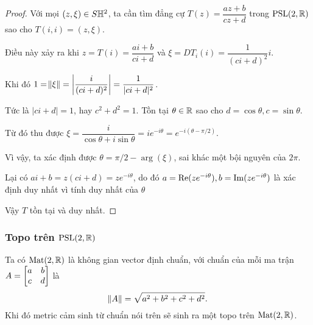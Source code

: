 \begin{proof}
    Với mọi $(z,\xi) \in S\mathbb{H}^2$, ta cần tìm đẳng cự $T(z) = \dfrac{az+b}{cz+d}$ trong $\operatorname{PSL}(2,\mathbb{R})$ sao cho $T(i,i) = (z,\xi)$. 

    Điều này xảy ra khi
    $z = T(i) = \dfrac{ai+b}{ci+d}$ và $\xi = DT_i(i) = \dfrac{1}{(ci+d)^2}i.$

    Khi đó $1 = \norm{\xi} = \left|\dfrac{i}{(ci+d)^2}\right|=\dfrac{1}{|ci+d|^2}$. 
    
    Tức là $|ci+d| = 1$, hay $c^2+d^2 = 1$. Tồn tại $\theta \in \mathbb{R}$ sao cho $d = \cos\theta, c=\sin\theta$. 
    
    Từ đó thu được $\xi = \dfrac{i}{\cos\theta + i\sin\theta} = ie^{-i\theta} = e^{-i(\theta -\pi/2)}$. 
    
    Vì vậy, ta xác định được $\theta =  \pi/2 - \arg(\xi)$, sai khác một bội nguyên của $2\pi$.

    Lại có $ai+b = z(ci+d) = ze^{-i\theta}$, do đó $a = \operatorname{Re}(ze^{-i\theta}), b = \operatorname{Im}(ze^{-i\theta})$ là xác định duy nhất vì tính duy nhất của $\theta$ 

    Vậy $T$ tồn tại và duy nhất. 
    
\end{proof}

\subsubsection{Topo trên $\operatorname{PSL}(2,\mathbb{R})$}
Ta có $\operatorname{Mat}(2,\mathbb{R})$ là không gian vector định chuẩn, với chuẩn của mỗi ma trận $A = \begin{bmatrix} a & b \\ c & d \\ \end{bmatrix} $ là 
\[\norm{A} = \sqrt{a^2+b^2+c^2+d^2}.\]
Khi đó metric cảm sinh từ chuẩn nói trên sẽ sinh ra một topo trên $\operatorname{Mat}(2,\mathbb{R})$. 


    

    
